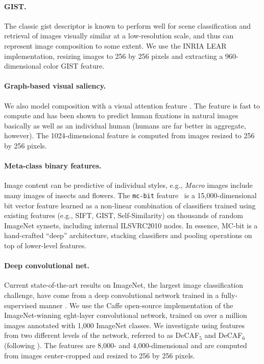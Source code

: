 \paragraph{GIST.}
The classic gist descriptor \parencite{Oliva-IJCV-2001} is known to perform well for scene classification and retrieval of images visually similar at a low-resolution scale, and thus can represent image composition to some extent.
We use the INRIA LEAR implementation, resizing images to 256 by 256 pixels and extracting a 960-dimensional color GIST feature.

\paragraph{Graph-based visual saliency.}
We also model composition with a visual attention feature \parencite{Harel-NIPS-2006}.
The feature is fast to compute and has been shown to predict human fixations in natural images basically as well as an individual human (humans are far better in aggregate, however).
The 1024-dimensional feature is computed from images resized to 256 by 256 pixels.

\paragraph{Meta-class binary features.}
Image content can be predictive of individual styles, e.g., \emph{Macro} images include many images of insects and flowers. The \texttt{mc-bit} feature~\parencite{Bergamo-CVPR-2012} is a 15,000-dimensional bit vector feature learned as a non-linear combination of classifiers trained using existing features (e.g., SIFT, GIST, Self-Similarity) on thousands of random ImageNet synsets, including internal ILSVRC2010 nodes.
In essence, MC-bit is a hand-crafted ``deep'' architecture, stacking classifiers and pooling operations on top of lower-level features.

\paragraph{Deep convolutional net.}
Current state-of-the-art results on ImageNet, the largest image classification challenge, have come from a deep convolutional network trained in a fully-supervised manner \parencite{krizhevsky2012imagenet}.
We use the Caffe \parencite{Jia13caffe} open-source implementation of the ImageNet-winning eght-layer convolutional network, trained on over a million images annotated with 1,000 ImageNet classes.
We investigate using features from two different levels of the network, referred to as DeCAF$_5$ and DeCAF$_6$ (following \parencite{Donahue2013}).
The features are 8,000- and 4,000-dimensional and are computed from images center-cropped and resized to 256 by 256 pixels.


